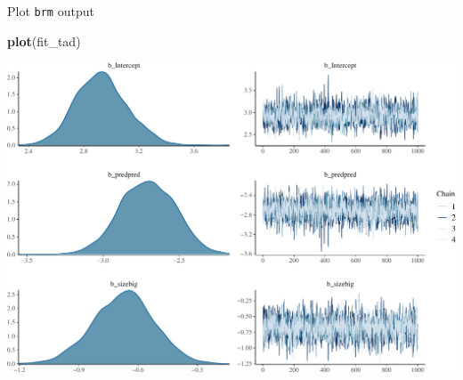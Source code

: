 \documentclass[
  ignorenonframetext,
]{beamer}
\newenvironment{Shaded}{\begin{snugshade}}{\end{snugshade}}
\newcommand{\KeywordTok}[1]{\textcolor[rgb]{0.13,0.29,0.53}{\textbf{#1}}}
\newcommand{\NormalTok}[1]{#1}
\begin{document}
\begin{frame}[fragile]{Plot \texttt{brm} output}
\protect\hypertarget{plot-brm-output}{}

\scriptsize

\begin{Shaded}
\begin{Highlighting}[]
\KeywordTok{plot}\NormalTok{(fit_tad)}
\end{Highlighting}
\end{Shaded}

\includegraphics{intro_Bayes_files/figure-beamer/unnamed-chunk-14-1.pdf}

\end{frame}
\end{document}
